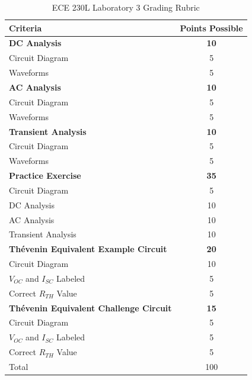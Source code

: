 \documentclass[12pt]{../manual}
\begin{document}
\begin{table}[ht!]
\caption{ECE 230L Laboratory 3 Grading Rubric}
\centering
\begin{tabular}{l|c} \hline
Criteria & Points Possible \\ \hline \hline
\textbf{DC Analysis}			& \textbf{10} \\
Circuit Diagram 				& 5 \\
Waveforms 						& 5 \\ \hline
\textbf{AC Analysis}			& \textbf{10} \\
Circuit Diagram 				& 5 \\
Waveforms 						& 5 \\ \hline
\textbf{Transient Analysis}		& \textbf{10} \\
Circuit Diagram 				& 5 \\ 
Waveforms 						& 5 \\ \hline
\textbf{Practice Exercise}		& \textbf{35} \\
Circuit Diagram 				& 5 \\
DC Analysis						& 10 \\
AC Analysis						& 10 \\
Transient Analysis				& 10 \\ \hline
\textbf{Th\'evenin Equivalent Example Circuit} & \textbf{20} \\
Circuit Diagram					& 10 \\
$V_{OC}$ and $I_{SC}$ Labeled	& 5 \\
Correct $R_{TH}$ Value			& 5 \\ \hline
\textbf{Th\'evenin Equivalent Challenge Circuit} & \textbf{15} \\
Circuit Diagram					& 5 \\
$V_{OC}$ and $I_{SC}$ Labeled	& 5 \\
Correct $R_{TH}$ Value			& 5 \\ \hline \hline
Total							& 100 \\ \hline
\end{tabular}
\end{table}
\vfill %
\end{document}
